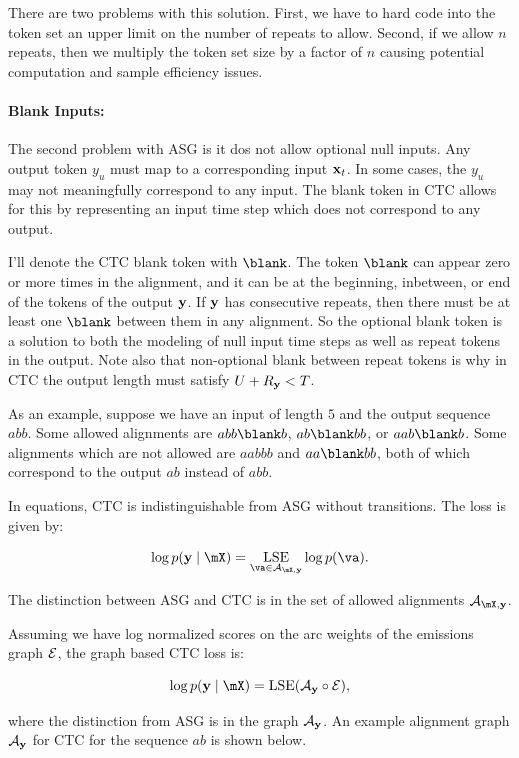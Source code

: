 There are two problems with this solution. First, we have to hard code into the
token set an upper limit on the number of repeats to allow. Second, if we allow
$n$ repeats, then we multiply the token set size by a factor of $n$ causing
potential computation and sample efficiency issues.

\paragraph{Blank Inputs:} The second problem with ASG is it dos not allow
optional null inputs. Any output token $y_u$ must map to a corresponding input
${\bf x}_t$. In some cases, the $y_u$ may not meaningfully correspond to any input.
The blank token in CTC allows for this by representing an input time step which
does not correspond to any output.

I'll denote the CTC blank token with $\blank$. The token $\blank$ can appear
zero or more times in the alignment, and it can be at the beginning, inbetween,
or end of the tokens of the output ${\bf y}$. If ${\bf y}$ has consecutive repeats,
then there must be at least one $\blank$ between them in any alignment. So the
optional blank token is a solution to both the modeling of null input time
steps as well as repeat tokens in the output. Note also that non-optional blank
between repeat tokens is why in CTC the output length must satisfy $U + R_{\bf y} <
T$.

As an example, suppose we have an input of length $5$ and the output sequence
$abb$. Some allowed alignments are $abb \blank b$, $ab \blank bb$, or $aa b
\blank b$. Some alignments which are not allowed are $aabbb$ and $aa\blank b
b$, both of which correspond to the output $ab$ instead of $abb$.

In equations, CTC is indistinguishable from ASG without transitions. The loss
is given by:

$$
\log p(\vy \mid \mX) = \LSE_{\va \in \gA_{\mX, \vy}} \log p(\va).
$$

The distinction between ASG and CTC is in the set of allowed alignments
$\gA_{\mX, \vy}$.

Assuming we have log normalized scores on the arc weights of the emissions
graph $\mathcal{E}$, the graph based CTC loss is:

$$
\log p(\vy \mid \mX) = \LSE(\gA_\vy \circ \gE),
$$

where the distinction from ASG is in the graph $\mathcal{A}_{\bf y}$. An example alignment
graph $\mathcal{A}_{\bf y}$ for CTC for the sequence $ab$ is shown below.

